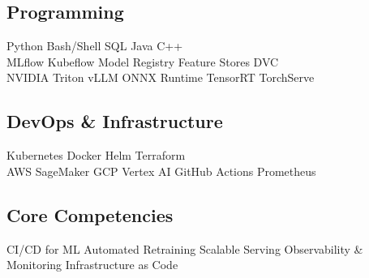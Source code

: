\documentclass[../main.tex]{subfiles}
\begin{document}
\subsection{Programming}
Python \textbullet{} Bash/Shell \textbullet{} SQL \textbullet{} Java \textbullet{} C++ \\
MLflow \textbullet{} Kubeflow \textbullet{} Model Registry \textbullet{} Feature Stores \textbullet{} DVC \\
NVIDIA Triton \textbullet{} vLLM \textbullet{} ONNX Runtime \textbullet{} TensorRT \textbullet{} TorchServe \\

\subsection{DevOps \& Infrastructure}
Kubernetes \textbullet{} Docker \textbullet{} Helm \textbullet{} Terraform \\
AWS SageMaker \textbullet{} GCP Vertex AI \textbullet{} GitHub Actions \textbullet{} Prometheus \\

\subsection{Core Competencies}
CI/CD for ML \textbullet{} Automated Retraining \textbullet{} Scalable Serving \textbullet{} Observability \& Monitoring \textbullet{} Infrastructure as Code
\end{document}
